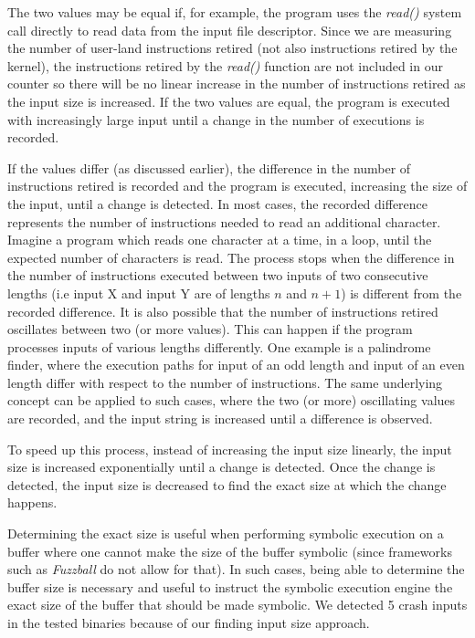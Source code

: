 \documentclass{sig-alternate-05-2015}
\begin{document}
The two values may be equal if, for example, the program uses the \textit{read()} system call directly to read data from the input file descriptor.
Since we are measuring the number of user-land instructions retired (not also instructions retired by the kernel), the instructions retired by the \textit{read()} function are not included in our counter so there will be no linear increase in the number of instructions retired as the input size is increased.
If the two values are equal, the program is executed with increasingly large input until a change in the number of executions is recorded.

If the values differ (as discussed earlier), the difference in the number of instructions retired is recorded and the program is executed, increasing the size of the input, until a change is detected.
In most cases, the recorded difference represents the number of instructions needed to read an additional character.
Imagine a program which reads one character at a time, in a loop, until the expected number of characters is read.
The process stops when the difference in the number of instructions executed between two inputs of two consecutive lengths (i.e input X and input Y are of lengths $n$ and $n+1$) is different from the recorded difference.
It is also possible that the number of instructions retired oscillates between two (or more values).
This can happen if the program processes inputs of various lengths differently.
One example is a palindrome finder, where the execution paths for input of an odd length and input of an even length differ with respect to the number of instructions.
The same underlying concept can be applied to such cases, where the two (or more) oscillating values are recorded, and the input string is increased until a difference is observed.


To speed up this process, instead of increasing the input size linearly, the input size is increased exponentially until a change is detected.
Once the change is detected, the input size is decreased to find the exact size at which the change happens.

Determining the exact size is useful when performing symbolic execution on a buffer where one cannot make the size of the buffer symbolic (since frameworks such as \textit{Fuzzball} do not allow for that).
In such cases, being able to determine the buffer size is necessary and useful to instruct the symbolic execution engine the exact size of the buffer that should be made symbolic.
We detected 5 crash inputs in the tested binaries because of our finding input size approach.
\end{document}

